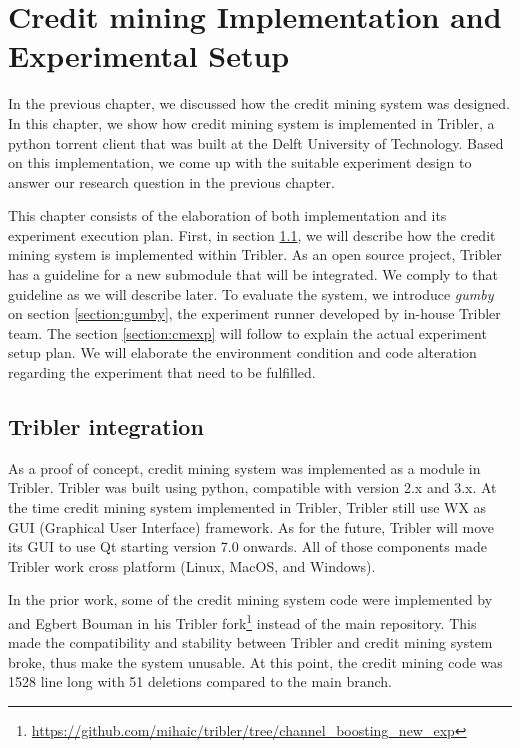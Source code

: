 \chapter{Credit mining Implementation and Experimental Setup}
\label{chp:implexperiment}
In the previous chapter, we discussed how the credit mining system was designed. In this chapter, we show how credit mining system is implemented in Tribler, a python torrent client that was built at the Delft University of Technology. Based on this implementation, we come up with the suitable experiment design to answer our research question in the previous chapter. 

This chapter consists of the elaboration of both implementation and its experiment execution plan. First, in section \ref{section:triblerintregration}, we will describe how the credit mining system is implemented within Tribler. As an open source project, Tribler has a guideline for a new submodule that will be integrated. We comply to that guideline as we will describe later. To evaluate the system, we introduce \textit{gumby} on section \ref{section:gumby}, the experiment runner developed by in-house Tribler team. The section \ref{section:cmexp} will follow to explain the actual experiment setup plan. We will elaborate the environment condition and code alteration regarding the experiment that need to be fulfilled.

\section{Tribler integration}
\label{section:triblerintregration}
As a proof of concept, credit mining system was implemented as a module in Tribler. Tribler was built using python, compatible with version 2.x and 3.x. At the time credit mining system implemented in Tribler, Tribler still use WX as GUI (Graphical User Interface) framework. As for the future, Tribler will move its GUI to use Qt starting version 7.0 onwards. All of those components made Tribler work cross platform (Linux, MacOS, and Windows).

In the prior work, some of the credit mining system code were implemented by \citeauthor{2015:creditmining:capota} and Egbert Bouman in his Tribler fork\footnote{\url{https://github.com/mihaic/tribler/tree/channel_boosting_new_exp}} instead of the main repository. This made the compatibility and stability between Tribler and credit mining system broke, thus make the system unusable. At this point, the credit mining code was 1528 line long with 51 deletions compared to the main branch.

